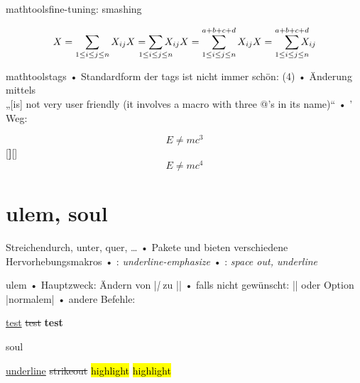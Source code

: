 \begin{frame}[fragile]{mathtools}{fine-tuning: smashing}
\begin{LTXexample}[pos=t]
\[X = \sum_{1\le i\le j\le n} X_{ij}
X = \sum_{\mathclap{1\le i\le j\le n}} X_{ij}
X = \sum_{\mathclap{1\le i\le j\le n}}^{a+b+c+d} X_{ij}
X = \smashoperator[r]{\sum_{1\le i\le j\le n}^{a+b+c+d}} X_{ij}
\]
\end{LTXexample}
\end{frame}

\begin{frame}[fragile]{mathtools}{tags}
• Standardform der tags ist nicht immer schön: (4)
• Änderung mittels \\%
„[is] not very user friendly (it involves a macro with three @’s in its name)“
• ’ Weg:
\• 
\begin{LTXexample}[width=.3\textwidth]
\begin{equation}E \neq mc^3\end{equation}
[\textbf]{[}{]}
\begin{equation}E \neq mc^4\end{equation}
\end{LTXexample}
\end{frame}

\section{ulem, soul}
\begin{frame}{Streichen}{durch, unter, quer, …}
• Pakete  und  bieten verschiedene Hervorhebungsmakros\pause
• : \emph{underline-emphasize}
• : \emph{space out, underline}
\•
\end{frame}

\begin{frame}[fragile]{ulem}
• Hauptzweck: Ändern von |\emph| zu |\underline|
• falls nicht gewünscht: |\normalem| oder Option |normalem|
• andere Befehle:
\•
\begin{LTXexample}
\uline{test}
\sout{test}
\useunder{\uwave}{\bfseries}{\textbf}
\textbf{test}
\end{LTXexample}
\end{frame}

\begin{frame}[fragile]{soul}
\begin{LTXexample} 
\ul{underline}
\st{strikeout}
\hl{highlight}
\hl{highlight}
\end{LTXexample}
\end{frame}

